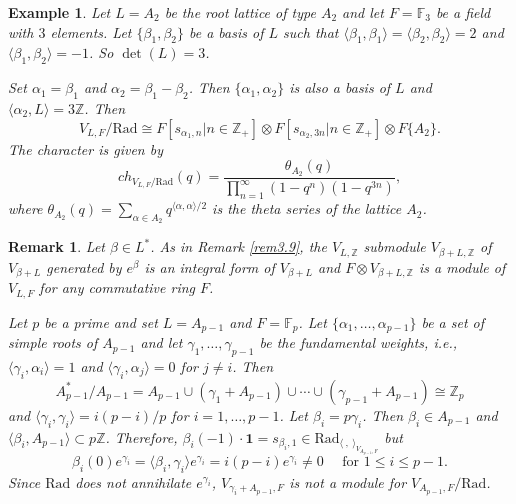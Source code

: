 \documentclass[12pt]{article}
\def\FF{{\mathbb F}}
\def\ZZ{{\mathbb Z}}
\newtheorem{rem}[thm]{Remark}
\newtheorem{ex}[thm]{Example}
\begin{document}
\begin{ex}\label{eA2}
Let $L= A_2$ be the root lattice of type $A_2$ and let $F=\mathbb{F}_3$ be a field with $3$ elements. Let $\{\beta_1, \beta_2\}$  be a basis of $L$ such that $\langle \beta_1, \beta_1\rangle=\langle \beta_2, \beta_2\rangle=2$ and $\langle \beta_1, \beta_2\rangle= -1$. So $\det(L)=3$. 

Set $\alpha_1= \beta_1$ and $\alpha_2= \beta_1- \beta_2$. Then $\{\alpha_1, \alpha_2\}$ is also a basis of $L$ and $\langle \alpha_2, L\rangle=3\ZZ$.   
Then 
\[
V_{L,F}/ \mathrm{Rad} \cong F[s_{\alpha_1, n}| n\in \ZZ_+]\otimes F[s_{\alpha_2, 3n}| n\in \ZZ_+]\otimes F\{A_2\}. 
\]
The character  is given by 
\[
ch_{V_{L,F}/ \mathrm{Rad}} (q) = \frac{\theta_{A_2} (q)} {\prod_{n=1}^\infty
(1-q^{n}) (1-q^{3n})}, 
\] 
where $\theta_{A_2}(q) =\sum_{\alpha\in A_2} q^{\langle \alpha, \alpha\rangle /2}$ is the theta series of the lattice $A_2$.  
\end{ex}



\begin{rem}Let $\beta \in L^*$.  
As in Remark \ref{rem3.9},  the $V_{L,\ZZ}$ submodule $V_{\beta+L, \ZZ}$  of $V_{\beta+L}$ generated by $e^\beta$ is an integral form of $V_{\beta+L}$ and $F\otimes V_{\beta+L, \ZZ}$ is a module of $V_{L,F}$  for any commutative ring  $F$.


Let $p$ be a prime and set $L=A_{p-1}$ and $F=\FF_p$. 
Let $\{\alpha_1,\dots  ,\alpha_{p-1}\}$ be a set of simple roots of $A_{p-1}$ and let 
$\gamma_1, \dots, \gamma_{p-1}$ be the fundamental weights, i.e., $\langle \gamma_i, \alpha_i\rangle =1$ and $\langle \gamma_i, \alpha_j\rangle =0$ for $j\neq i$.  Then 
\[
A_{p-1}^*/A_{p-1} = A_{p-1}\cup (\gamma_1+A_{p-1}) \cup \cdots \cup (\gamma_{p-1} +A_{p-1}) \cong \ZZ_p
\]  
and $\langle \gamma_i, \gamma_i\rangle = i(p-i)/p$ for $i=1, \dots, p-1$. 
Let $\beta_i=p\gamma_i$. Then $\beta_i\in A_{p-1} $ and $\langle \beta_i ,A_{p-1}\rangle \subset p\ZZ$. Therefore,  $\beta_i(-1)\cdot\mathbf{1} =s_{\beta_i,1}\in \mathrm{Rad}_{\langle \ , \ \rangle_{V_{A_{p-1},F}}}$ but 
\[
\beta_i(0) e^{\gamma_i} = \langle \beta_i, \gamma_i\rangle e^{\gamma_i} =i(p-i) e^{ \gamma_i}\neq 0 \quad \text{ for  } 1\leq i\leq p-1.
\] 
Since $\mathrm{Rad}$ does not annihilate  $e^{\gamma_i}$,  $V_{\gamma_i+ A_{p-1}, F} $ is not a module for $V_{A_{p-1},F}/\mathrm{Rad}$.    
\end{rem}
\end{document}
